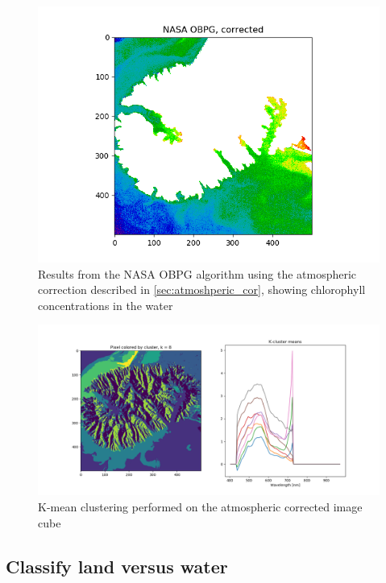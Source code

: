\begin{figure}
    \centering
    \includegraphics[width=\textwidth]{../fig/NASA OBPG, corrected.png}
    \caption{Results from the NASA OBPG algorithm using the atmospheric correction described 
    in \cref{sec:atmoshperic_cor}, showing chlorophyll concentrations in the water}
    \label{fig:obpg_corrected}
\end{figure}


\begin{figure}
    \centering
    \includegraphics[width=\textwidth]{../fig/kmean/kmean_corrected8.png}
    \caption{K-mean clustering performed on the atmospheric corrected image cube}
    \label{fig:kmean_corrected}
\end{figure}



\subsection{Classify land versus water}
\label{sec:landmask}

